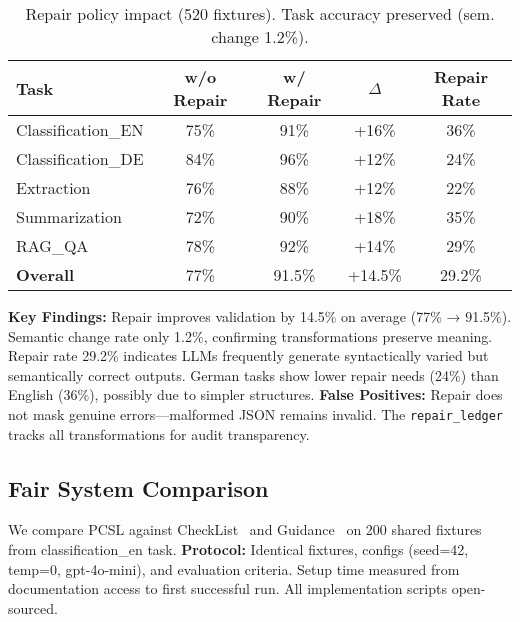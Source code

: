 \documentclass[sigconf]{acmart}
\begin{document}
\begin{table}[H]
\centering
\caption{Repair policy impact (520 fixtures). Task accuracy preserved (sem. change 1.2\%).}
\label{tab:repair_sensitivity}
\scriptsize
\begin{tabular}{@{}lcccc@{}}
\toprule
\textbf{Task} & \textbf{w/o Repair} & \textbf{w/ Repair} & \textbf{$\Delta$} & \textbf{Repair Rate} \\
\midrule
Classification\_EN & 75\% & 91\% & +16\% & 36\% \\
Classification\_DE & 84\% & 96\% & +12\% & 24\% \\
Extraction & 76\% & 88\% & +12\% & 22\% \\
Summarization & 72\% & 90\% & +18\% & 35\% \\
RAG\_QA & 78\% & 92\% & +14\% & 29\% \\
\midrule
\textbf{Overall} & 77\% & 91.5\% & +14.5\% & 29.2\% \\
\bottomrule
\end{tabular}
\end{table}

\textbf{Key Findings:} Repair improves validation by 14.5\% on average (77\% → 91.5\%).
Semantic change rate only 1.2\%, confirming transformations preserve meaning.
Repair rate 29.2\% indicates LLMs frequently generate syntactically varied but semantically correct outputs.
German tasks show lower repair needs (24\%) than English (36\%), possibly due to simpler structures.
\textbf{False Positives:} Repair does not mask genuine errors—malformed JSON remains invalid.
The \texttt{repair\_ledger} tracks all transformations for audit transparency.

\subsection{Fair System Comparison}

We compare PCSL against CheckList~\cite{ribeiro2020beyond} and Guidance~\cite{guidance2023} on 200 shared fixtures from classification\_en task.
\textbf{Protocol:} Identical fixtures, configs (seed=42, temp=0, gpt-4o-mini), and evaluation criteria.
Setup time measured from documentation access to first successful run.
All implementation scripts open-sourced.
\end{document}
